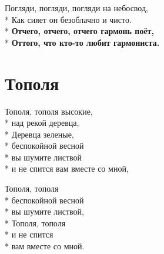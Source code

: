 \medskip

\begin{minipage}{\linewidth}
Погляди, погляди, погляди на небосвод,\\*
Как сияет он безоблачно и чисто.\\*
\textbf{Отчего, отчего, отчего гармонь поёт,}\\*
\textbf{Оттого, что кто-то любит гармониста.}\\
\end{minipage}

\vspace{\fill}\newpage

\section{Тополя}
\label{song:Тополя}

\medskip

\begin{minipage}{\linewidth}
Тополя, тополя высокие,\\*
над рекой деревца,\\*
Деревца зеленые,\\*
беспокойной весной\\*
вы шумите листвой\\*
и не спится вам вместе со мной,\\
\end{minipage}\par\medskip\nobreak

\medskip

\begin{minipage}{\linewidth}
\hspace*{1.5em}Тополя, тополя\\*
\hspace*{1.5em}беспокойной весной\\*
\hspace*{1.5em}вы шумите листвой,\\*
\hspace*{1.5em}Тополя, тополя\\*
\hspace*{1.5em}и не спится\\*
\hspace*{1.5em}вам вместе со мной.\\
\end{minipage}\par\medskip\nobreak

